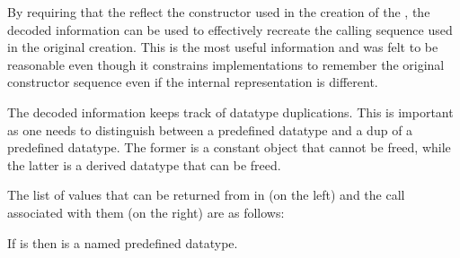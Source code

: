 \begin{rationale}
By requiring that the  reflect the constructor used
in the creation
of the , the decoded information can be used
to effectively recreate the calling sequence used in the original
creation.
This is the most useful information and
was
felt to be reasonable even though it constrains implementations to
remember the original constructor sequence even if the internal
representation is different.

The decoded information keeps track of datatype duplications.  This is
important as one needs to distinguish between a predefined datatype
and a dup of a predefined datatype.  The former is a constant object
that cannot be freed, while the latter is a derived datatype that can
be freed.
\end{rationale}

The list of values that can be returned from  in
 (on the left) and the call associated with them (on the right) are as follows:
\begin{constlist}[180pt]
\end{constlist}

If  is  then  is a
named predefined datatype.

